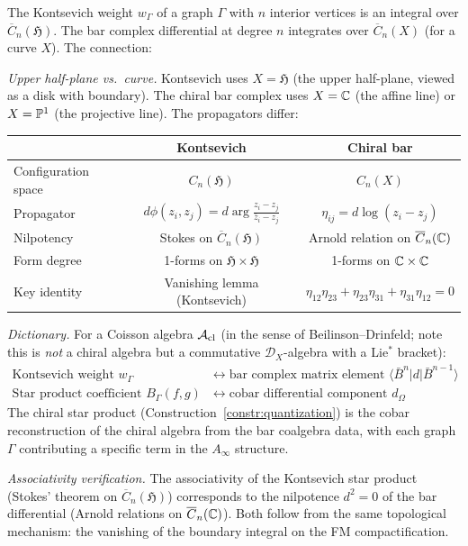 \begin{computation}
\label{comp:kontsevich-bar-connection}

The Kontsevich weight $w_\Gamma$ of a graph $\Gamma$ with $n$
interior vertices is an integral over $\overline{C}_n(\mathfrak{H})$.
The bar complex differential at degree $n$ integrates over
$\overline{C}_n(X)$ (for a curve $X$).  The connection:

\emph{Upper half-plane vs.\ curve.}
Kontsevich uses $X = \mathfrak{H}$ (the upper half-plane, viewed as
a disk with boundary).  The chiral bar complex uses $X = \mathbb{C}$ (the
affine line) or $X = \mathbb{P}^1$ (the projective line).  The propagators
differ:
\begin{center}
\renewcommand{\arraystretch}{1.2}
\begin{tabular}{l|cc}
& Kontsevich & Chiral bar \\
\hline
Configuration space & $C_n(\mathfrak{H})$ & $C_n(X)$ \\
Propagator & $d\phi(z_i, z_j) = d\arg\frac{z_i - z_j}
{\bar{z}_i - z_j}$ &
$\eta_{ij} = d\log(z_i - z_j)$ \\
Nilpotency & Stokes on $\overline{C}_n(\mathfrak{H})$ &
Arnold relation on $\overline{C}_n(\mathbb{C})$ \\
Form degree & 1-forms on $\mathfrak{H} \times \mathfrak{H}$ &
1-forms on $\mathbb{C} \times \mathbb{C}$ \\
Key identity & Vanishing lemma (Kontsevich) &
$\eta_{12}\eta_{23} + \eta_{23}\eta_{31} + \eta_{31}\eta_{12} = 0$
\end{tabular}
\end{center}

\emph{Dictionary.}
For a Coisson algebra $\mathcal{A}_{\mathrm{cl}}$
(in the sense of Beilinson--Drinfeld; note this is \emph{not} a chiral algebra but a commutative $\mathcal{D}_X$-algebra with a Lie$^*$ bracket):
\begin{align}
\text{Kontsevich weight } w_\Gamma
&\longleftrightarrow
\text{bar complex matrix element }
\langle \bar{B}^n | d | \bar{B}^{n-1} \rangle \\
\text{Star product coefficient } B_\Gamma(f,g)
&\longleftrightarrow
\text{cobar differential component } d_\Omega
\end{align}
The chiral star product (Construction~\ref{constr:quantization}) is
the cobar reconstruction of the chiral algebra from the bar coalgebra
data, with each graph $\Gamma$ contributing a specific term in the
$A_\infty$ structure.

\emph{Associativity verification.}
The associativity of the Kontsevich star product (Stokes' theorem
on $\overline{C}_n(\mathfrak{H})$) corresponds to the nilpotence
$d^2 = 0$ of the bar differential (Arnold relations on
$\overline{C}_n(\mathbb{C})$).  Both follow from the same topological
mechanism: the vanishing of the boundary integral on the FM
compactification.
\end{computation}


